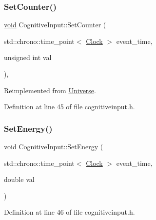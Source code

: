 \subsubsection{\texorpdfstring{Set\+Counter()}{SetCounter()}}
{\footnotesize\ttfamily \mbox{\hyperlink{glad_8h_a950fc91edb4504f62f1c577bf4727c29}{void}} Cognitive\+Input\+::\+Set\+Counter (\begin{DoxyParamCaption}\item[{std\+::chrono\+::time\+\_\+point$<$ \mbox{\hyperlink{universe_8h_a0ef8d951d1ca5ab3cfaf7ab4c7a6fd80}{Clock}} $>$}]{event\+\_\+time,  }\item[{unsigned int}]{val }\end{DoxyParamCaption})\hspace{0.3cm}{\ttfamily [inline]}, {\ttfamily [virtual]}}



Reimplemented from \mbox{\hyperlink{class_universe_aa22202ae740eb1355529afcb13285e91}{Universe}}.



Definition at line 45 of file cognitiveinput.\+h.

\mbox{\label{class_cognitive_input_a3498a8b5333606ef4d089e6c427ddf74}} 
\subsubsection{\texorpdfstring{Set\+Energy()}{SetEnergy()}}
{\footnotesize\ttfamily \mbox{\hyperlink{glad_8h_a950fc91edb4504f62f1c577bf4727c29}{void}} Cognitive\+Input\+::\+Set\+Energy (\begin{DoxyParamCaption}\item[{std\+::chrono\+::time\+\_\+point$<$ \mbox{\hyperlink{universe_8h_a0ef8d951d1ca5ab3cfaf7ab4c7a6fd80}{Clock}} $>$}]{event\+\_\+time,  }\item[{double}]{val }\end{DoxyParamCaption})\hspace{0.3cm}{\ttfamily [inline]}}



Definition at line 46 of file cognitiveinput.\+h.

\mbox{\label{class_cognitive_input_a37d38512fb190431b4baf8f990c077a9}} 
